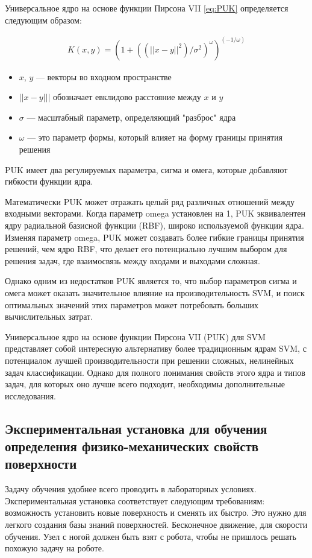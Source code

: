Универсальное ядро на основе функции Пирсона VII \eqref{eq:PUK} определяется следующим образом:

\begin{align}
    \label{eq:PUK}
    K(x, y) = (1 + ((||x - y||^2)/\sigma^2)^\omega)^{(-1/\omega)}
\end{align}

\begin{itemize}
    \item $x$, $y$ --- векторы во входном пространстве
    \item $||x - y|||$ обозначает евклидово расстояние между $x$ и $y$
    \item $\sigma$ --- масштабный параметр, определяющий "разброс" ядра
    \item $\omega$ --- это параметр формы, который влияет на форму границы принятия решения
\end{itemize}

PUK имеет два регулируемых параметра, сигма и омега, которые добавляют гибкости функции ядра.

Математически PUK может отражать целый ряд различных отношений между входными векторами. Когда параметр omega установлен на 1, PUK эквивалентен ядру радиальной базисной функции (RBF), широко используемой функции ядра. Изменяя параметр omega, PUK может создавать более гибкие границы принятия решений, чем ядро RBF, что делает его потенциально лучшим выбором для решения задач, где взаимосвязь между входами и выходами сложная.

Однако одним из недостатков PUK является то, что выбор параметров сигма и омега может оказать значительное влияние на производительность SVM, и поиск оптимальных значений этих параметров может потребовать больших вычислительных затрат.

Универсальное ядро на основе функции Пирсона VII (PUK) для SVM представляет собой интересную альтернативу более традиционным ядрам SVM, с потенциалом лучшей производительности при решении сложных, нелинейных задач классификации. Однако для полного понимания свойств этого ядра и типов задач, для которых оно лучше всего подходит, необходимы дополнительные исследования.

\subsection{Экспериментальная установка для обучения определения физико-механических свойств поверхности}
Задачу обучения удобнее всего проводить в лабораторных условиях. Экспериментальная установка соответствует следующим требованиям: возможность установить новые поверхность и сменять их быстро. Это нужно для легкого создания базы знаний поверхностей. Бесконечное движение, для скорости обучения. Узел с ногой должен быть взят с робота, чтобы не пришлось решать похожую задачу на роботе.

